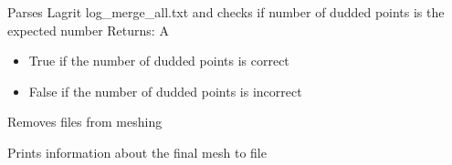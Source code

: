 \documentclass[letterpaper,10pt,english]{sphinxmanual}
\begin{document}
\begin{fulllineitems}
\label{\detokenize{pydfnworks:pydfnworks.mesh_dfn_helper.check_dudded_points}}
Parses Lagrit log\_merge\_all.txt and checks if number of dudded points
is the expected number
Returns: A
\begin{itemize}
\item {} 
True if the number of dudded points is correct

\item {} 
False if the number of dudded points is incorrect

\end{itemize}

\end{fulllineitems}


\begin{fulllineitems}
\label{\detokenize{pydfnworks:pydfnworks.mesh_dfn_helper.cleanup_dir}}
Removes files from meshing

\end{fulllineitems}


\begin{fulllineitems}
\label{\detokenize{pydfnworks:pydfnworks.mesh_dfn_helper.output_meshing_report}}
Prints information about the final mesh to file

\end{fulllineitems}

\end{document}
